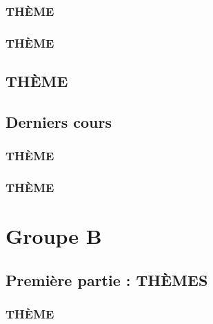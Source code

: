 \documentclass[poly,trombi]{valbonne}
\begin{document}

\subsection{THÈME}


\subsection{THÈME}


\section{THÈME}






\section{Derniers cours}

\subsection{THÈME}


\subsection{THÈME}


\chapter{Groupe B}

\minitoc \clearpage

\section{Première partie : THÈMES}

\subsection{THÈME}
\end{document}
